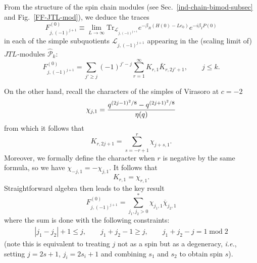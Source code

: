 \documentclass[11pt]{article}
\newcommand{\JTL}[1]{JTL_{#1}}
\newcommand{\AIrrTL}[2]{\mathscr{L}_{#1,#2}}
\newcommand{\APrTL}[1]{\widehat{\mathscr{P}}_{#1}}
\theoremstyle{definition}
\begin{document}
From the structure of the spin chain modules (see
Sec.~\ref{ind-chain-bimod-subsec} and Fig.~\ref{FF-JTL-mod}), we
deduce the traces
\begin{equation}
F_{j,(-1)^{j+1}}^{(0)}\equiv \lim_{L\to\infty} \mathrm{Tr}_{\AIrrTL{j}{(-1)^{j+1}}} e^{-\beta_R(H(0)-Le_0)}e^{-i\beta_I P(0)}
\end{equation}
 in each of
the simple subquotients $\AIrrTL{j}{(-1)^{j+1}}$
 appearing in the
(scaling limit of) $\JTL{}$-modules $\APrTL{k}$:
%
\begin{equation}
F_{j,(-1)^{j+1}}^{(0)}=\sum_{j'\geq j}
(-1)^{j'-j}\sum_{r=1}^\infty K_{r,1}\bar{K}_{r,2j'+1},\qquad j\leq k.
\end{equation}
%


On the other hand, recall the characters of the simples of Virasoro at $c=-2$
%
\begin{equation}
\chi_{j,1}={q^{(2j-1)^2/8}-q^{(2j+1)^2/8}\over\eta(q)}
\end{equation}
%
from which it follows that
%
\begin{equation}
K_{r,2j+1}=\sum_{s=-r+1}^r \chi_{j+s,1}.
\end{equation}
Moreover, we formally define the character when $r$ is negative by the same formula, so we have
$\chi_{-j,1}=-\chi_{j,1}$. It follows that
%
\begin{equation}
K_{r,1}=\chi_{r,1}.
\end{equation}
  Straightforward algebra then leads to the key result
  \begin{equation}\label{app:Fs-Vir-content-gen}
  F_{j,(-1)^{j+1}}^{(0)}=\sum_{j_1,j_2> 0}^* \chi_{j_1,1}\overline{\chi}_{j_2,1}
  \end{equation}
  where the sum is done with the following constraints:
  \begin{eqnarray}\label{app:cond-sum-star}
  |j_1-j_2|+1\leq j,\qquad %
  j_1+j_2-1\geq j, \qquad %
  j_1+j_2 - j = 1\; \text{mod} \; 2
  \end{eqnarray}
 (note this is equivalent to treating $j$ not as a spin but as a degeneracy, {\it i.e.}, setting $j=2s+1$, $j_i=2s_i+1$ and combining $s_1$ and $s_2$ to obtain spin $s$).
\end{document}
